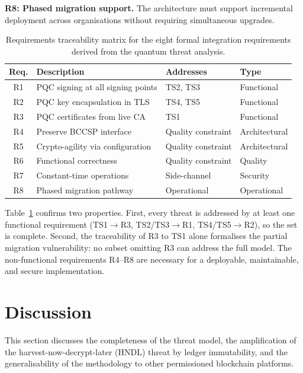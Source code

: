 \documentclass[conference]{IEEEtran}
\begin{document}
\textbf{R8: Phased migration support.} The architecture must support incremental
deployment across organisations without requiring simultaneous upgrades.

\begin{table}[ht]
\centering
\caption{Requirements traceability matrix for the eight formal integration requirements derived from the quantum threat analysis.}
\label{tab:req_traceability}
\setlength{\tabcolsep}{5pt}
\footnotesize
\begin{tabular}{@{}cl>{\raggedright\arraybackslash}p{2.1cm}l@{}}
\toprule
\textbf{Req.} & \textbf{Description} & \textbf{Addresses} &
\textbf{Type} \\
\midrule
R1 & PQC signing at all signing points   & TS2, TS3          & Functional \\
R2 & PQC key encapsulation in TLS        & TS4, TS5          & Functional \\
R3 & PQC certificates from live CA       & TS1               & Functional \\
R4 & Preserve BCCSP interface            & Quality constraint & Architectural \\
R5 & Crypto-agility via configuration    & Quality constraint & Architectural \\
R6 & Functional correctness              & Quality constraint & Quality \\
R7 & Constant-time operations            & Side-channel       & Security \\
R8 & Phased migration pathway            & Operational        & Operational \\
\bottomrule
\end{tabular}
\end{table}

Table~\ref{tab:req_traceability} confirms two properties. First, every threat is
addressed by at least one functional requirement (TS1$\to$R3, TS2/TS3$\to$R1,
TS4/TS5$\to$R2), so the set is complete. Second, the traceability of R3 to TS1
alone formalises the partial migration vulnerability: no subset omitting R3 can
address the full model. The non-functional requirements R4--R8 are necessary for
a deployable, maintainable, and secure implementation.

\section{Discussion}
\label{sec:tm_discussion}

This section discusses the completeness of the threat model, the amplification of the harvest-now-decrypt-later (HNDL) threat by ledger immutability, and the generalisability of the methodology to other permissioned blockchain platforms.
\end{document}
